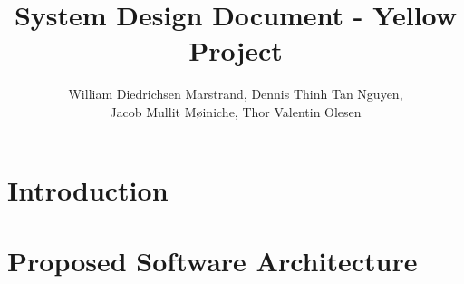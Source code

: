 \documentclass{article}
\title{System Design Document - Yellow Project}
\author{William Diedrichsen Marstrand, Dennis Thinh Tan Nguyen, 
\\Jacob Mullit Møiniche, Thor Valentin Olesen}
\begin{document}
\maketitle
\newpage
\tableofcontents
\newpage

\section{Introduction}
	
	
	\pagebreak
\section{Proposed Software Architecture}
	
	
	\pagebreak
	
	
	
\end{document}
